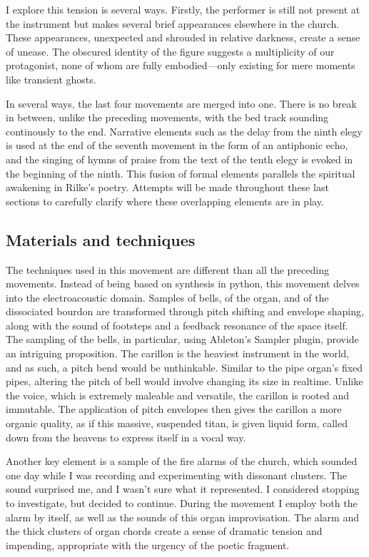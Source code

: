 \documentclass[12pt,twoside,maitrise]{dms_ks}
\theoremstyle{definition}
\begin{document}
I explore this tension is several ways. Firstly, the performer is still not present at the instrument but makes several brief appearances elsewhere in the church. These appearances, unexpected and shrouded in relative darkness, create a sense of unease. The obscured identity of the figure suggests a multiplicity of our protagonist, none of whom are fully embodied—only existing for mere moments like transient ghosts.

In several ways, the last four movements are merged into one. There is no break in between, unlike the preceding movements, with the bed track sounding continously to the end. Narrative elements such as the delay from the ninth elegy is used at the end of the seventh movement in the form of an antiphonic echo, and the singing of hymns of praise from the text of the tenth elegy is evoked in the beginning of the ninth. This fusion of formal elements parallels the spiritual awakening in Rilke’s poetry. Attempts will be made throughout these last sections to carefully clarify where these overlapping elements are in play.

\subsection{Materials and techniques}

The techniques used in this movement are different than all the preceding movements. 
Instead of being based on synthesis in python, this movement delves into the electroacoustic domain. 
Samples of bells, of the organ, and of the dissociated bourdon are transformed through pitch shifting and envelope shaping, along with the sound of footsteps and a feedback resonance of the space itself. 
The sampling of the bells, in particular, using Ableton’s Sampler plugin, provide an intriguing proposition. 
The carillon is the heaviest instrument in the world, and as such, a pitch bend would be unthinkable. 
Similar to the pipe organ's fixed pipes, altering the pitch of bell would involve changing its size in realtime. 
Unlike the voice, which is extremely maleable and versatile, the carillon is rooted and immutable. 
The application of pitch envelopes then gives the carillon a more organic quality, as if this massive, suspended titan, is given liquid form, called down from the heavens to express itself in a vocal way.

Another key element is a sample of the fire alarms of the church, which sounded one day while I was recording and experimenting with dissonant clusters. 
The sound surprised me, and I wasn’t sure what it represented. 
I considered stopping to investigate, but decided to continue. 
During the movement I employ both the alarm by itself, as well as the sounds of this organ improvisation.
The alarm and the thick clusters of organ chords create a sense of dramatic tension and impending, appropriate with the urgency of the poetic fragment. 
\end{document}
